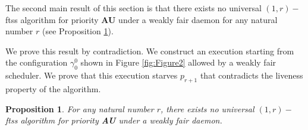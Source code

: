 \documentclass[11pt,english,letterpaper]{article}
\newtheorem{proposition}{Proposition}
\begin{document}
The second main result of this section is that there exists no universal $(1,r)-$ftss algorithm for priority \textbf{AU} under a weakly fair daemon for any natural number $r$ (see Proposition \ref{prop:impWFPri}).

We prove this result by contradiction. We construct an execution starting from the configuration $\gamma_{0}^{0}$ shown in Figure \ref{fig:Figure2} allowed by a weakly fair scheduler. We prove that this execution starves $p_{r+1}$ that contradicts the liveness property of the algorithm. 

\begin{proposition}\label{prop:impWFPri}
For any natural number $r$, there exists no universal $(1,r)-$ftss algorithm for \emph{priority} \textbf{AU} under a weakly fair daemon.
\end{proposition}
\end{document}
